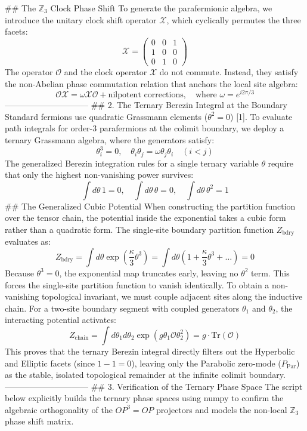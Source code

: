 ## The $\mathbb{Z}_3$ Clock Phase Shift
To generate the parafermionic algebra, we introduce the unitary clock shift operator $\mathcal{X}$, which cyclically permutes the three facets:
$$\mathcal{X} = \begin{pmatrix} 0 & 0 & 1 \\ 1 & 0 & 0 \\ 0 & 1 & 0 \end{pmatrix}$$ 
The operator $\mathcal{O}$ and the clock operator $\mathcal{X}$ do not commute. Instead, they satisfy the non-Abelian phase commutation relation that anchors the local site algebra:
$$\mathcal{O}\mathcal{X} = \omega \mathcal{X}\mathcal{O} + \text{nilpotent corrections}, \quad \text{where } \omega = e^{i 2\pi/3}$$ 
------------------------------
## 2. The Ternary Berezin Integral at the Boundary
Standard fermions use quadratic Grassmann elements ($\theta^2=0$) [1]. To evaluate path integrals for order-$3$ parafermions at the colimit boundary, we deploy a ternary Grassmann algebra, where the generators satisfy:
$$\theta_i^3 = 0, \quad \theta_i \theta_j = \omega \theta_j \theta_i \quad (i < j)$$ 
The generalized Berezin integration rules for a single ternary variable $\theta$ require that only the highest non-vanishing power survives:
$$\int d\theta \, 1 = 0, \quad \int d\theta \, \theta = 0, \quad \int d\theta \, \theta^2 = 1$$ 
## The Generalized Cubic Potential
When constructing the partition function over the tensor chain, the potential inside the exponential takes a cubic form rather than a quadratic form. The single-site boundary partition function $Z_{\text{bdry}}$ evaluates as:
$$Z_{\text{bdry}} = \int d\theta \exp\left( \frac{\kappa}{3} \theta^3 \right) = \int d\theta \left( 1 + \frac{\kappa}{3}\theta^3 + \dots \right) = 0$$ 
Because $\theta^3 = 0$, the exponential map truncates early, leaving no $\theta^2$ term. This forces the single-site partition function to vanish identically.
To obtain a non-vanishing topological invariant, we must couple adjacent sites along the inductive chain. For a two-site boundary segment with coupled generators $\theta_1$ and $\theta_2$, the interacting potential activates:
$$Z_{\text{chain}} = \int d\theta_1 d\theta_2 \exp\left( g \theta_1 \mathcal{O} \theta_2^2 \right) = g \cdot \text{Tr}(\mathcal{O})$$ 
This proves that the ternary Berezin integral directly filters out the Hyperbolic and Elliptic facets (since $1 - 1 = 0$), leaving only the Parabolic zero-mode ($P_{\text{Par}}$) as the stable, isolated topological remainder at the infinite colimit boundary.
------------------------------
## 3. Verification of the Ternary Phase Space
The script below explicitly builds the ternary phase spaces using numpy to confirm the algebraic orthogonality of the $OP^3 = OP$ projectors and models the non-local $\mathbb{Z}_3$ phase shift matrix.

